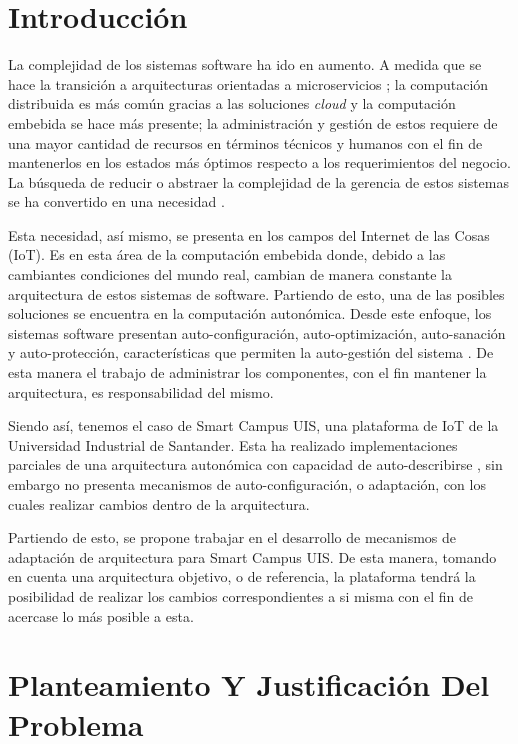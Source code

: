 \documentclass[12pt]{article}
\begin{document}
    
    
    \section{Introducción}

    La complejidad de los sistemas software ha ido en aumento. A medida que se hace la transición a arquitecturas orientadas a microservicios \cite{forrester_research_2019}; la computación distribuida es más común gracias a las soluciones \textit{cloud} \cite{the_cloud_in_2021} y la computación embebida se hace más presente;  la administración y gestión de estos requiere de una mayor cantidad de recursos en términos técnicos y humanos con el fin de mantenerlos en los estados más óptimos respecto a los requerimientos del negocio. La búsqueda de reducir o abstraer la complejidad de la gerencia de estos sistemas se ha convertido en una necesidad \cite{lalanda_diaconescu_mccann_2014}.

    Esta necesidad, así mismo, se presenta en los campos del Internet de las Cosas (IoT). Es en esta área de la computación embebida donde, debido a las cambiantes condiciones del mundo real, cambian de manera constante la arquitectura de estos sistemas de software. Partiendo de esto, una de las posibles soluciones se encuentra en la computación autonómica. Desde este enfoque, los sistemas software presentan auto-configuración, auto-optimización, auto-sanación y auto-protección, características que permiten la auto-gestión del sistema \cite{evaluation_2004}. De esta manera el trabajo de administrar los componentes, con el fin mantener la arquitectura, es responsabilidad del mismo.
    
    Siendo así, tenemos el caso de Smart Campus UIS, una plataforma de IoT de la Universidad Industrial de Santander. Esta ha realizado implementaciones parciales de una arquitectura autonómica con capacidad de auto-describirse \cite{henry_2020}, sin embargo no presenta mecanismos de auto-configuración, o adaptación, con los cuales realizar cambios dentro de la arquitectura.
    
    Partiendo de esto, se propone trabajar en el desarrollo de mecanismos de adaptación de arquitectura para Smart Campus UIS. De esta manera, tomando en cuenta una arquitectura objetivo, o de referencia, la plataforma tendrá la posibilidad de realizar los cambios correspondientes a si misma con el fin de acercase lo más posible a esta.

    \section{Planteamiento Y Justificación Del Problema}
\end{document}
